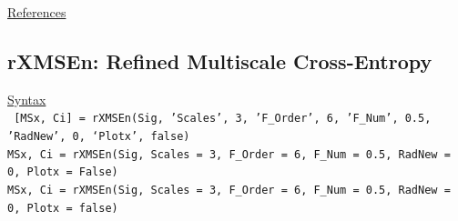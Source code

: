 \documentclass[12pt, a4paper, titlepage, openany]{book}
\begin{document}
\noindent \ul{References}\hspace{1cm}
\cite{XMS1} \cite{XMS2} \cite{XMS3} \cite{XMS4} \cite{cMS1} 



\newpage
\subsection{\normalsize rXMSEn: \hspace{15mm} Refined Multiscale Cross-Entropy}
\noindent\ul{Syntax} \vspace{6mm} \\ \noindent \texttt{\footnotesize
[MSx, Ci] = rXMSEn(Sig, 'Scales', 3, 'F\_Order', 6, 'F\_Num', 0.5, 'RadNew', 0, ‘Plotx’, false)\\
MSx, Ci = rXMSEn(Sig, Scales = 3, F\_Order = 6, F\_Num = 0.5, RadNew = 0, Plotx = False)\\ 
MSx, Ci = rXMSEn(Sig, Scales = 3, F\_Order = 6, F\_Num = 0.5, RadNew = 0, Plotx = false)}
\end{document}
